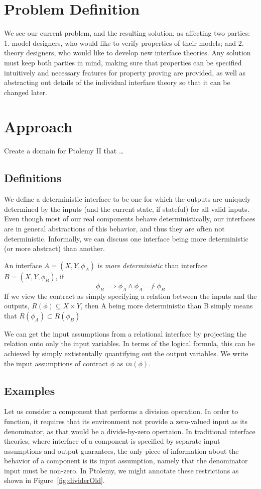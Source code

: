 \documentclass[preprint,11pt]{sigplanconf}
\begin{document}
\section{Problem Definition}
We see our current problem, and the resulting solution, as affecting two
parties:
1. model designers, who would like to verify properties of their models;
and
2. theory designers, who would like to develop new interface theories.
%
Any solution must keep both parties in mind, making sure that properties
can be specified intuitively and necessary features for property proving are
provided, as well as abstracting out details of the individual interface theory
so that it can be changed later.

\section{Approach}
Create a domain for Ptolemy II that \dots

\subsection{Definitions}
We define a deterministic interface to be one for which the outputs are
uniquely determined by the inputs (and the current state, if stateful) for all
valid inputs.
Even though most of our real components behave deterministically, our
interfaces are in general abstractions of this behavior, and thus they are
often not deterministic.
Informally, we can discuss one interface being more deterministic (or more
abstract) than another.

An interface $A=(X,Y,\phi_A)$ is \emph{more deterministic} than interface
$B=(X,Y,\phi_B)$, if
\[
\phi_B \implies \phi_A \wedge \phi_A \not\implies \phi_B
\]
If we view the contract as simply specifying a relation between the inputs and
the outputs, $R(\phi) \subseteq X \times Y$, then A being more deterministic
than B simply means that $R(\phi_A) \subset R(\phi_B)$

We can get the input assumptions from a relational interface by
projecting the relation onto only the input variables.  In terms of
the logical formula, this can be achieved by simply extistentally quantifying
out the output variables.  We write the input assumptions of contract $\phi$ as
$in(\phi)$.

\subsection{Examples}
Let us consider a component that performs a division operation.  In order to
function, it requires that its environment not provide a zero-valued input as
its denominator, as that would be a divide-by-zero opertaion. In traditional
interface theories, where interface of a component is specified by separate
input assumptions and output guarantees, the only piece of information about
the behavior of a component is its input assumption, namely that the
denominator input must be non-zero. In Ptolemy, we might annotate these
restrictions as shown in Figure~\ref{fig:dividerOld}.
\end{document}
